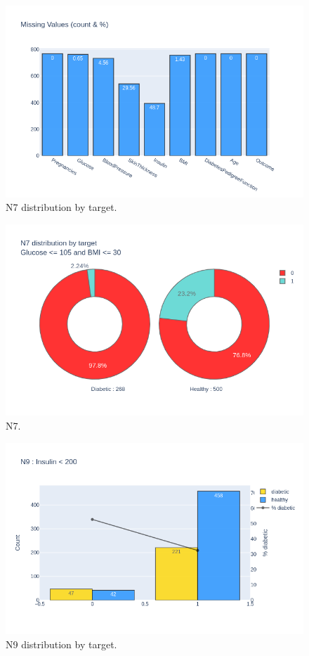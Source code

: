 \documentclass[12pt]{article}
\begin{document}
\begin{figure}[ht]
\centering
\includegraphics[width=1\textwidth]{newplot(2).png}
\caption{N7 distribution by target.}
\end{figure}

\begin{figure}[ht]
\centering
\includegraphics[width=1\textwidth]{newplot(30).png}
\caption{N7.}
\end{figure}


\begin{figure}[ht]
\centering
\includegraphics[width=1\textwidth]{newplot(32).png}
\caption{N9 distribution by target.}
\end{figure}
\end{document}
